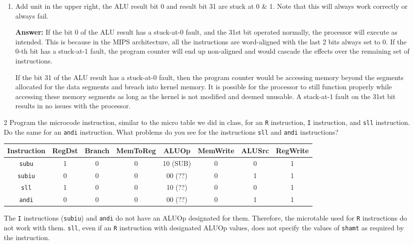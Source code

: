 \documentclass[12pt]{article}
\begin{document}
\begin{enumerate}
\begin{enumerate}[label=4.6.\arabic*]
    \item Add unit in the upper right, the ALU result bit 0 and result bit 31 are stuck at 0 \& 1.  Note that this will always work correctly or always fail.

    \textbf{Answer:} If the bit 0 of the ALU result has a stuck-at-0 fault, and the 31st bit operated normally, the processor will execute as intended. This is because in the MIPS architecture, all the instructions are word-aligned with the last 2 bits always set to 0. If the 0-th bit has a stuck-at-1 fault, the program counter will end up non-aligned and would cascade the effects over the remaining set of instructions.

    If the bit 31 of the ALU result has a stuck-at-0 fault, then the program counter would be accessing memory beyond the segments allocated for the data segments and breach into kernel memory. It is possible for the processor to still function properly while accessing these memory segments as long as the kernel is not modified and deemed unusable. A stack-at-1 fault on the 31st bit results in no issues with the processor.

  \end{enumerate}

  \item[2] Program the microcode instruction, similar to the micro table we did in class, for an \texttt{R} instruction, \texttt{I} instruction, and \texttt{sll} instruction.  Do the same for an \texttt{andi} instruction.  What problems do you see for the instructions \texttt{sll} and \texttt{andi} instructions?

    \begin{center}
      \begin{tabular}{|c|c|c|c|c|c|c|c|}
      \hline
      Instruction & RegDst & Branch & MemToReg & ALUOp & MemWrite & ALUSrc & RegWrite \\
      \hline
      \texttt{subu} & 1 & 0 & 0 & 10 (SUB) & 0 & 0 & 1 \\
      \hline
      \texttt{subiu} & 0 & 0 & 0 & 00 (??) & 0 & 1 & 1 \\
      \hline
      \texttt{sll} & 1 & 0 & 0 & 10 (??) & 0 & 0 & 1 \\
      \hline
      \texttt{andi} & 0 & 0 & 0 & 00 (??) & 0 & 1 & 1 \\
      \hline
      \end{tabular}
    \end{center}

    The \texttt{I} instructions (\texttt{subiu}) and \texttt{andi} do not have an ALUOp designated for them. Therefore, the microtable used for \texttt{R} instructions do not work with them. \texttt{sll}, even if an \texttt{R} instruction with designated ALUOp values, does not specify the values of \texttt{shamt} as required by the instruction.

  \end{enumerate}
\end{document}
